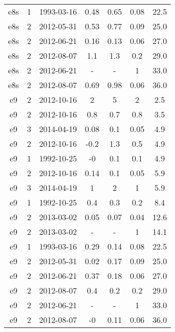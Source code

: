 \begin{table*}[htp]
\begin{tabular}{ccccccc}
e8s & 1 & 1993-03-16 & 0.48 & 0.65 & 0.08 & 22.5 \\
e8s & 2 & 2012-05-31 & 0.53 & 0.77 & 0.09 & 25.0 \\
e8s & 2 & 2012-06-21 & 0.16 & 0.13 & 0.06 & 27.0 \\
e8s & 2 & 2012-08-07 & 1.1 & 1.3 & 0.2 & 29.0 \\
e8s & 2 & 2012-06-21 & - & - & 1 & 33.0 \\
e8s & 2 & 2012-08-07 & 0.69 & 0.98 & 0.06 & 36.0 \\
e9 & 2 & 2012-10-16 & 2 & 5 & 2 & 2.5 \\
e9 & 2 & 2012-10-16 & 0.8 & 0.7 & 0.8 & 3.5 \\
e9 & 3 & 2014-04-19 & 0.08 & 0.1 & 0.05 & 4.9 \\
e9 & 2 & 2012-10-16 & -0.2 & 1.3 & 0.5 & 4.9 \\
e9 & 1 & 1992-10-25 & -0 & 0.1 & 0.1 & 4.9 \\
e9 & 2 & 2012-10-16 & 0.14 & 0.1 & 0.05 & 5.9 \\
e9 & 3 & 2014-04-19 & 1 & 2 & 1 & 5.9 \\
e9 & 1 & 1992-10-25 & 0.4 & 0.3 & 0.2 & 8.4 \\
e9 & 2 & 2013-03-02 & 0.05 & 0.07 & 0.04 & 12.6 \\
e9 & 2 & 2013-03-02 & - & - & 1 & 14.1 \\
e9 & 1 & 1993-03-16 & 0.29 & 0.14 & 0.08 & 22.5 \\
e9 & 2 & 2012-05-31 & 0.02 & 0.17 & 0.09 & 25.0 \\
e9 & 2 & 2012-06-21 & 0.37 & 0.18 & 0.06 & 27.0 \\
e9 & 2 & 2012-08-07 & 0.4 & 0.2 & 0.2 & 29.0 \\
e9 & 2 & 2012-06-21 & - & - & 1 & 33.0 \\
e9 & 2 & 2012-08-07 & -0 & 0.11 & 0.06 & 36.0 \\
\hline
\end{tabular}

\end{table*}
